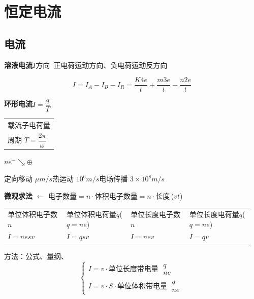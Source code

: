 \chapter{恒定电流}
\label{ch:10}

\section{电流}
\textbf{溶液电流}\quad $I$方向\ 正电荷运动方向、负电荷运动反方向

\[
I=I_A-I_B-I_R=\frac{K4e}{t}+\frac{m3e}{t}-\frac{n2e}{t}
\]

\textbf{环形电流}\quad $I=\dfrac{q}{T}$\quad
\begin{tabular}[c]{@{}l@{}}载流子电荷量\\ 周期 $T=\dfrac{2\pi}{\omega}$\end{tabular}\quad $ne^-\searrow\oplus$%

定向移动 $\mu\unit{m/s}$\quad 热运动 $10^6\unit{m/s}$\quad 电场传播 $3\times10^8\unit{m/s}$

\textbf{微观求法} $\leftarrow$ 电子数量$=n\cdot$体积\qquad 电子数量$=n\cdot$长度\,($vt$)%

\medskip
\noindent\begin{tabular}{@{}p{0.23\linewidth}p{0.25\linewidth}p{0.23\linewidth}p{0.25\linewidth}@{}}
单位体积电子数$n$ & 单位体积电荷量$q$\newline ($q=ne$) & 单位长度电子数$n$ & 单位长度电荷量$q$\newline ($q=ne$) \\[3pt]
$I=nesv$ & $I=qsv$ & $I=nev$ & $I=qv$ \\
\end{tabular}

\medskip
方法：公式、量纲、
\[
\left\{\begin{array}{l}
I=v\cdot\text{单位长度带电量}\;\substack{q\\ ne}\\[6pt]
I=v\cdot S\cdot\text{单位体积带电量}\;\substack{q\\ ne}
\end{array}\right.
\]


